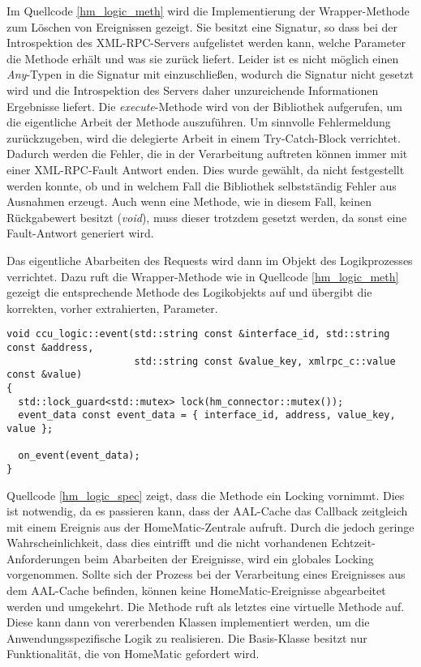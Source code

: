 Im Quellcode \ref{hm_logic_meth} wird die Implementierung der Wrapper-Methode zum Löschen von Ereignissen
gezeigt.
Sie besitzt eine Signatur, so dass bei der Introspektion des XML-RPC-Servers aufgelistet werden kann, welche
Parameter die Methode erhält und was sie zurück liefert.
Leider ist es nicht möglich einen \emph{Any}-Typen in die Signatur mit einzuschließen, wodurch die Signatur
nicht gesetzt wird und die Introspektion des Servers daher unzureichende Informationen Ergebnisse liefert.
Die \emph{execute}-Methode wird von der Bibliothek aufgerufen, um die eigentliche Arbeit der Methode
auszuführen.
Um sinnvolle Fehlermeldung zurückzugeben, wird die delegierte Arbeit in einem Try-Catch-Block verrichtet.
Dadurch werden die Fehler, die in der Verarbeitung auftreten können immer mit einer XML-RPC-Fault Antwort
enden.
Dies wurde gewählt, da nicht festgestellt werden konnte, ob und in welchem Fall die Bibliothek selbstständig
Fehler aus Ausnahmen erzeugt.
Auch wenn eine Methode, wie in diesem Fall, keinen Rückgabewert besitzt (\emph{void}), muss dieser trotzdem gesetzt
werden, da sonst eine Fault-Antwort generiert wird.

Das eigentliche Abarbeiten des Requests wird dann im Objekt des Logikprozesses verrichtet.
Dazu ruft die Wrapper-Methode wie in Quellcode \ref{hm_logic_meth} gezeigt die entsprechende Methode des Logikobjekts
auf und übergibt die korrekten, vorher extrahierten, Parameter.

\lstset{language=C++}
\begin{lstlisting}[frame=single,caption={Rumpf einer Methode mit Locking im Logikprozess},label=hm_logic_spec]
void ccu_logic::event(std::string const &interface_id, std::string const &address,
                      std::string const &value_key, xmlrpc_c::value const &value)
{
  std::lock_guard<std::mutex> lock(hm_connector::mutex());
  event_data const event_data = { interface_id, address, value_key, value };

  on_event(event_data);
}
\end{lstlisting}

Quellcode \ref{hm_logic_spec} zeigt, dass die Methode ein Locking vornimmt.
Dies ist notwendig, da es passieren kann, dass der AAL-Cache das Callback zeitgleich mit einem Ereignis aus
der HomeMatic-Zentrale aufruft.
Durch die jedoch geringe Wahrscheinlichkeit, dass dies eintrifft und die nicht vorhandenen Echtzeit-Anforderungen
beim Abarbeiten der Ereignisse, wird ein globales Locking vorgenommen.
Sollte sich der Prozess bei der Verarbeitung eines Ereignisses aus dem AAL-Cache befinden, können keine
HomeMatic-Ereignisse abgearbeitet werden und umgekehrt.
Die Methode ruft als letztes eine virtuelle Methode auf.
Diese kann dann von vererbenden Klassen implementiert werden, um die Anwendungsspezifische Logik zu realisieren.
Die Basis-Klasse besitzt nur Funktionalität, die von HomeMatic gefordert wird.

